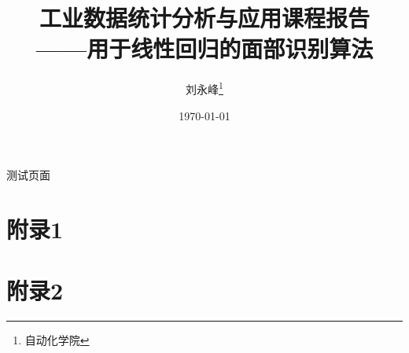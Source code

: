 \documentclass[UTF8]{ctexart}
\title{工业数据统计分析与应用课程报告\\——用于线性回归的面部识别算法}
\author{刘永峰\thanks{自动化学院}}
\date{\today}
\begin{document}
    \maketitle
        测试页面
        \appendix
        \appendixpage
        \section{附录1}
        \section{附录2}
    
\end{document}
